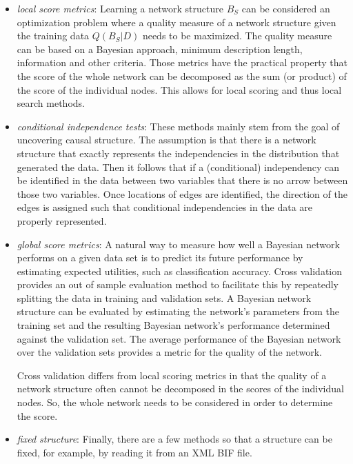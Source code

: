 \documentclass{article}
\begin{document}
\begin{itemize}
\item {\em local score metrics}: 
Learning a network structure $B_S$ can be considered an optimization
problem where a quality measure of a network structure given the
training data $Q(B_S|D)$ needs to be maximized. The quality measure
can be based on a Bayesian approach,  minimum description length,
information and other criteria. Those metrics have the practical property
that the score of the whole network can be decomposed as the sum 
(or product) of the score of the individual nodes. This allows for 
local scoring and thus local search methods.

\item {\em conditional independence tests}:
These methods mainly stem from the goal of uncovering causal structure.
The assumption is that there is a network structure that exactly represents
the independencies in the distribution that generated the data. Then it
follows that if a (conditional) independency can be identified in the data
between two variables that there is no arrow between those two 
variables. Once locations of edges are identified, the direction of the edges
is assigned such that conditional independencies in the data are properly
represented.

\item {\em global score metrics}:
A natural way to measure how well a Bayesian network performs on a
given data set is to predict its future performance by estimating
expected utilities, such as classification accuracy.  Cross validation
provides an out of sample evaluation method to facilitate this by
repeatedly splitting the data in training and validation sets.  A
Bayesian network structure  can be evaluated by estimating the
network's parameters from the training set and the resulting Bayesian
network's performance determined against the validation set.  The
average performance of the Bayesian network over the validation sets
provides a metric for the quality of the network.

Cross validation differs from local scoring metrics  in that the quality
of a network structure often cannot be decomposed in the scores of the
individual nodes. So, the whole network needs to be considered in order
to determine the score.

\item {\em fixed structure}:
Finally, there are a few methods so that a structure can be fixed, for
example, by reading it from an XML BIF file.
\end{itemize}
\end{document}
